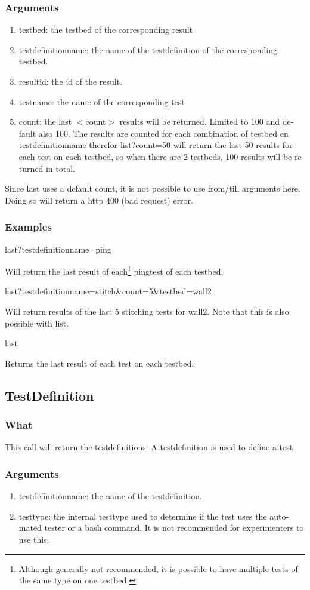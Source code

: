 \begin{otherlanguage}{english}
\subsubsection{Arguments}
\begin{enumerate}
\item testbed: the testbed of the corresponding result
\item testdefinitionname: the name of the testdefinition of the corresponding testbed.
\item resultid: the id of the result.
\item testname: the name of the corresponding test
\item count: the last $<$count$>$ results will be returned. Limited to 100 and default also 100. The results are counted for each combination of testbed en testdefinitionname therefor list?count=50 will return the last 50 results for each test on each testbed, so when there are 2 testbeds, 100 results will be returned in total.
\end{enumerate}
\npar
Since last uses a default count, it is not possible to use from/till arguments here. Doing so will return a http 400 (bad request) error.
\subsubsection{Examples}
\begin{lt}
last?testdefinitionname=ping
\end{lt}
Will return the last result of each\footnote{Although generally not recommended, it is possible to have multiple tests of the same type on one testbed.} pingtest of each testbed.
\npar
\begin{lt}
last?testdefinitionname=stitch\&count=5\&testbed=wall2
\end{lt}
Will return results of the last 5 stitching tests for wall2. Note that this is also possible with list.
\npar
\begin{lt}
last
\end{lt}
Returns the last result of each test on each testbed.
\clearpage
\subsection{TestDefinition}
\subsubsection{What}
This call will return the testdefinitions. A testdefinition is used to define a test.
\subsubsection{Arguments}
\begin{enumerate}
\item testdefinitionname: the name of the testdefinition.
\item testtype: the internal testtype used to determine if the test uses the automated tester or a bash command. It is not recommended for experimenters to use this.
\end{enumerate}

\end{otherlanguage}
